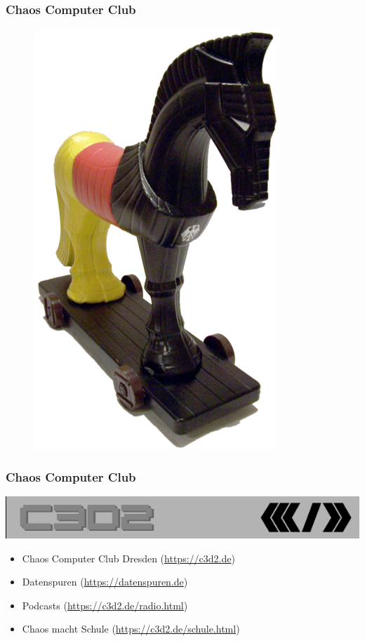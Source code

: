 \documentclass[12pt, xcolor={svgnames,table}]{beamer}
\begin{document}
\begin{frame}
  \frametitle{Chaos Computer Club}
  \begin{figure}
    \includegraphics[height=0.7\textheight]{img/trojaner.png}
  \end{figure}
\end{frame}

\begin{frame}
    \frametitle{Chaos Computer Club}
    \begin{center}
	\includegraphics[height=0.1\textheight]{img/c3d2_logo.png}
    \end{center}
    \begin{itemize}
      \item<1-> Chaos Computer Club Dresden (\url{https://c3d2.de})          
      \item<2-> Datenspuren (\url{https://datenspuren.de})
      \item<3-> Podcasts (\url{https://c3d2.de/radio.html})
      \item<4-> Chaos macht Schule (\url{https://c3d2.de/schule.html})
    \end{itemize}
\end{frame}
\end{document}
